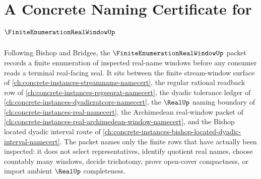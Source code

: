 \chapter{A Concrete Naming Certificate for $\FiniteEnumerationRealWindowUp$}
\label{ch:concrete-instances-finite-enumeration-real-window-namecert}

Following Bishop and Bridges, the $\FiniteEnumerationRealWindowUp$ packet records a finite enumeration of inspected real-name windows before any consumer reads a terminal real-facing seal. It sits between the finite stream-window surface of \autoref{ch:concrete-instances-streamname-namecert}, the regular rational readback row of \autoref{ch:concrete-instances-regseqrat-namecert}, the dyadic tolerance ledger of \autoref{ch:concrete-instances-dyadicratcore-namecert}, the $\RealUp$ naming boundary of \autoref{ch:concrete-instances-real-namecert}, the Archimedean real-window packet of \autoref{ch:concrete-instances-real-archimedean-window-namecert}, and the Bishop located dyadic interval route of \autoref{ch:concrete-instances-bishop-located-dyadic-interval-namecert}. The packet names only the finite rows that have actually been inspected: it does not select representatives, identify quotient real names, choose countably many windows, decide trichotomy, prove open-cover compactness, or import ambient $\RealUp$ completeness.

